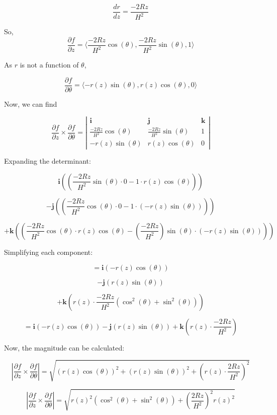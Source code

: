 \documentclass{article}
\begin{document}
\[
\frac{dr}{dz} = \frac{-2Rz}{H^2}
\]

So,
\[
\frac{\partial f}{\partial z} = \langle \frac{-2Rz}{H^2} \cos(\theta), \frac{-2Rz}{H^2} \sin(\theta), 1 \rangle
\]

As $r$ is not a function of $\theta$, 

\[
\frac{\partial f}{\partial \theta} = \langle -r(z) \sin(\theta), r(z) \cos(\theta), 0 \rangle
\]

Now, we can find

\[
\frac{\partial f}{\partial z} \times \frac{\partial f}{\partial \theta} = \left| \begin{matrix} \mathbf{i} & \mathbf{j} & \mathbf{k} \\ \frac{-2Rz}{H^2} \cos(\theta) & \frac{-2Rz}{H^2} \sin(\theta) & 1 \\ -r(z) \sin(\theta) & r(z) \cos(\theta) & 0 \end{matrix} \right|
\]

Expanding the determinant:

\[
\mathbf{i} \left( \left( \frac{-2Rz}{H^2} \sin(\theta) \cdot 0 - 1 \cdot r(z) \cos(\theta) \right) \right)
\]

\[
- \mathbf{j} \left( \left( \frac{-2Rz}{H^2} \cos(\theta) \cdot 0 - 1 \cdot (-r(z) \sin(\theta)) \right) \right)
\]

\[
+ \mathbf{k} \left( \left( \frac{-2Rz}{H^2} \cos(\theta) \cdot r(z) \cos(\theta) - (\frac{-2Rz}{H^2}) \sin(\theta) \cdot (-r(z) \sin(\theta)) \right) \right)
\]

Simplifying each component:

\[
= \mathbf{i} \left( -r(z) \cos(\theta) \right)
\]

\[
- \mathbf{j} \left( r(z) \sin(\theta) \right)
\]

\[
+ \mathbf{k} \left( r(z) \cdot \frac{-2Rz}{H^2} \left( \cos^2(\theta) + \sin^2(\theta) \right) \right)
\]



\[
= \mathbf{i} \left( -r(z) \cos(\theta) \right)
- \mathbf{j} \left( r(z) \sin(\theta) \right)
+ \mathbf{k} \left( r(z) \cdot \frac{-2Rz}{H^2} \right)
\]

Now, the magnitude can be calculated:

\[
\left| \frac{\partial f}{\partial z} \times \frac{\partial f}{\partial \theta} \right| = \sqrt{ \left( r(z) \cos(\theta) \right)^2 + \left( r(z) \sin(\theta) \right)^2 + \left( r(z) \cdot \frac{2Rz}{H^2} \right)^2 }
\]

\[
\left| \frac{\partial f}{\partial z} \times \frac{\partial f}{\partial \theta} \right| = \sqrt{ r(z)^2 \left( \cos^2(\theta) + \sin^2(\theta) \right) + \left( \frac{2Rz}{H^2} \right)^2 r(z)^2 }
\]
\end{document}
